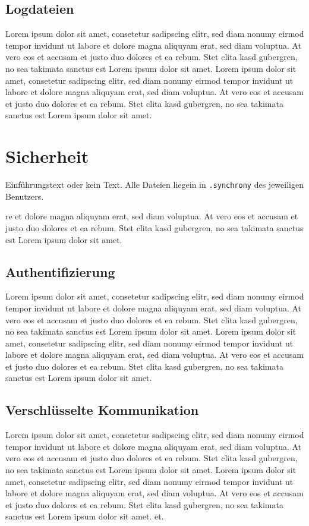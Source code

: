 \documentclass[12pt,oneside,a4paper,bibtotoc,liststotoc,pointlessnumbers]{scrartcl}
\begin{document}
\subsection{Logdateien}
Lorem ipsum dolor sit amet, consetetur sadipscing elitr, sed diam nonumy eirmod tempor invidunt ut labore et dolore magna aliquyam erat, sed diam voluptua. At vero eos et accusam et justo duo dolores et ea rebum. Stet clita kasd gubergren, no sea takimata sanctus est Lorem ipsum dolor sit amet. Lorem ipsum dolor sit amet, consetetur sadipscing elitr, sed diam nonumy eirmod tempor invidunt ut labore et dolore magna aliquyam erat, sed diam voluptua. At vero eos et accusam et justo duo dolores et ea rebum. Stet clita kasd gubergren, no sea takimata sanctus est Lorem ipsum dolor sit amet.

\newpage
\section{Sicherheit}
Einführungstext oder kein Text. Alle Dateien liegein in \texttt{.synchrony} des jeweiligen Benutzers.

\vspace{12px}
re et dolore magna aliquyam erat, sed diam voluptua. At vero eos et accusam et justo duo dolores et ea rebum. Stet clita kasd gubergren, no sea takimata sanctus est Lorem ipsum dolor sit amet.
\subsection{Authentifizierung}

Lorem ipsum dolor sit amet, consetetur sadipscing elitr, sed diam nonumy eirmod tempor invidunt ut labore et dolore magna aliquyam erat, sed diam voluptua. At vero eos et accusam et justo duo dolores et ea rebum. Stet clita kasd gubergren, no sea takimata sanctus est Lorem ipsum dolor sit amet. Lorem ipsum dolor sit amet, consetetur sadipscing elitr, sed diam nonumy eirmod tempor invidunt ut labore et 
dolore magna aliquyam erat, sed diam voluptua. At vero eos et accusam et justo duo dolores et ea rebum. Stet clita kasd gubergren, no sea takimata sanctus est Lorem ipsum dolor sit amet.
\subsection{Verschlüsselte Kommunikation}

Lorem ipsum dolor sit amet, consetetur sadipscing elitr, sed diam nonumy eirmod tempor invidunt ut labore et dolore magna aliquyam erat, sed diam voluptua. At vero eos et accusam et justo duo dolores et ea rebum. Stet clita kasd gubergren, no sea takimata sanctus est Lorem ipsum dolor sit amet. Lorem ipsum dolor sit amet, consetetur sadipscing elitr, sed diam nonumy eirmod tempor invidunt ut labore et dolore magna aliquyam erat, sed diam voluptua. At vero eos et accusam et justo duo dolores et ea rebum. Stet clita kasd gubergren, no sea takimata sanctus est Lorem ipsum dolor sit amet.
et.
\end{document}
